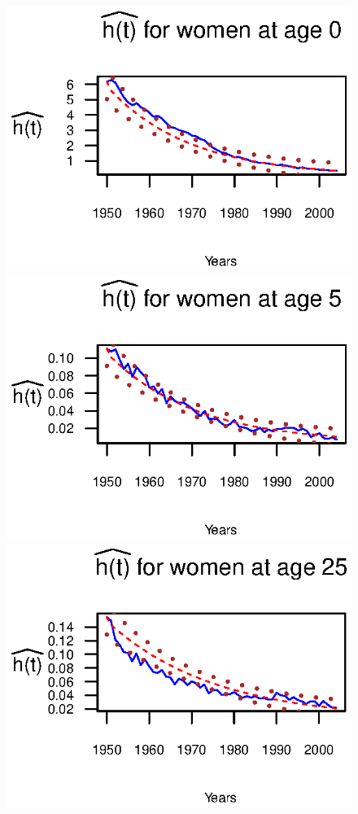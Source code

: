 \documentclass[smallextended]{svjour3}
\begin{document}
\begin{figure}[H]
    \includegraphics{PlotWomen0.eps}
    \includegraphics{PlotWomen5.eps}
    \includegraphics{PlotWomen25.eps}

\end{figure}
\end{document}
